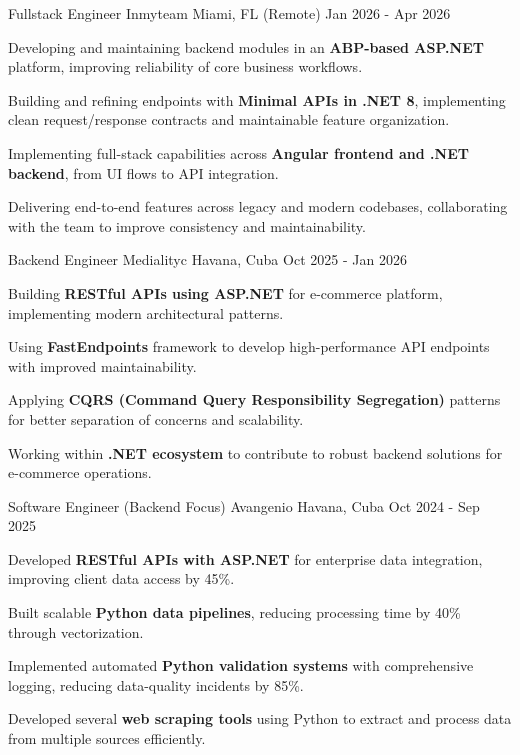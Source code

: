 \documentclass[]{awesome-cv}
\begin{document}
\begin{cventries}
  \cventry
    {Fullstack Engineer}
    {Inmyteam}
    {Miami, FL (Remote)}
    {Jan 2026 - Apr 2026}
    {\begin{cvitems}
      \item Developing and maintaining backend modules in an \textbf{ABP-based ASP.NET} platform, improving reliability of core business workflows.
      \item Building and refining endpoints with \textbf{Minimal APIs in .NET 8}, implementing clean request/response contracts and maintainable feature organization.
      \item Implementing full-stack capabilities across \textbf{Angular frontend and .NET backend}, from UI flows to API integration.
      \item Delivering end-to-end features across legacy and modern codebases, collaborating with the team to improve consistency and maintainability.
        \end{cvitems}}

  \cventry
    {Backend Engineer}
    {Medialityc}
    {Havana, Cuba}
    {Oct 2025 - Jan 2026}
    {\begin{cvitems}
        \item Building \textbf{RESTful APIs using ASP.NET} for e-commerce platform, implementing modern architectural patterns.
        \item Using \textbf{FastEndpoints} framework to develop high-performance API endpoints with improved maintainability.
        \item Applying \textbf{CQRS (Command Query Responsibility Segregation)} patterns for better separation of concerns and scalability.
        \item Working within \textbf{.NET ecosystem} to contribute to robust backend solutions for e-commerce operations.
        \end{cvitems}}

  \cventry
    {Software Engineer (Backend Focus)}
    {Avangenio}
    {Havana, Cuba}
    {Oct 2024 - Sep 2025}
    {\begin{cvitems}
        \item Developed \textbf{RESTful APIs with ASP.NET} for enterprise data integration, improving client data access by 45\%.
        \item Built scalable \textbf{Python data pipelines}, reducing processing time by 40\% through vectorization.
        \item Implemented automated \textbf{Python validation systems} with comprehensive logging, reducing data-quality incidents by 85\%.
        \item Developed several \textbf{web scraping tools} using Python to extract and process data from multiple sources efficiently.
        \end{cvitems}}


\end{cventries}
\end{document}
